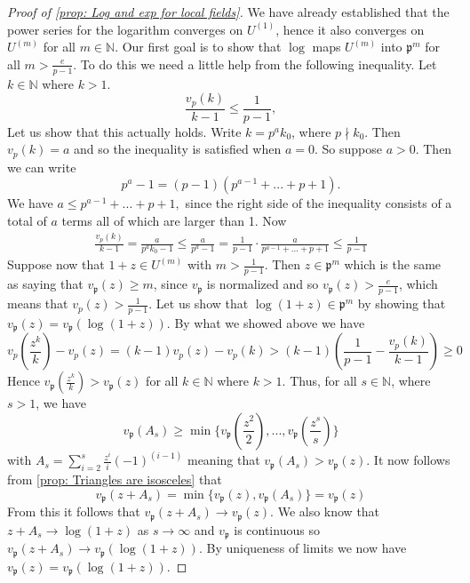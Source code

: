 \documentclass{article}
\newcommand{\mfrak}[1]{\mathfrak{#1}}
\newcommand{\mbb}[1]{\mathbb{#1}}
\newcommand{\vp}{{v_{\mfrak p}}}
\numberwithin{equation}{section}
\begin{document}
\begin{proof}[Proof of \cref{prop: Log and exp for local fields}]
    We have already established that the power series for the logarithm converges on $U^{(1)}$, hence it also converges on $U^{(m)}$ for all $m \in \mbb N$. Our first goal is to show that $\log$ maps $U^{(m)}$ into $\mfrak p^{m}$ for all $m > \frac{e}{p-1}$.  To do this we need a little help from the following inequality. Let $k \in \mbb N$ where $k > 1$.
    $$\frac{v_p(k)}{k-1} \leq \frac{1}{p-1},$$
    Let us show that this actually holds. Write $k = p^ak_0$, where $p \nmid k_0$. Then $v_p(k) = a$ and so the inequality is satisfied when $a = 0$. So suppose $a > 0$. Then we can write
    $$p^a - 1 = (p-1)(p^{a-1} + ... + p + 1).$$
    We have
    $a \leq p^{a-1} + ... + p + 1,$
    since the right side of the inequality consists of a total of $a$ terms all of which are larger than 1. Now
    \begin{align*}
        \frac{v_p(k)}{k-1} = \frac{a}{p^ak_0-1} \leq \frac{a}{p^a - 1} = \frac{1}{p-1}\cdot \frac{a}{p^{a-1} + ... + p + 1} \leq \frac{1}{p-1}
    \end{align*}
    Suppose now that $1+z \in U^{(m)}$ with $m > \frac{1}{p-1}$. Then $z \in \mfrak p^m$ which is the same as saying that $\vp (z) \geq m$, since $\vp$ is normalized and so $\vp(z) > \frac{e}{p-1}$, which means that $v_p(z) > \frac{1}{p-1}$. Let us show that $\log(1+z) \in \mfrak p^m$ by showing that $\vp(z) = \vp(\log(1+ z))$. By what we showed above we have
    $$v_p(\frac{z^k}{k}) - v_p(z) = (k-1)v_p(z) - v_p(k) > (k-1)(\frac{1}{p-1} - \frac{v_p(k)}{k-1}) \geq 0$$
    Hence $\vp(\frac{z^k}{k}) > \vp(z)$ for all $k \in \mbb N$ where $k > 1$. Thus, for all $s \in \mbb N$, where $s > 1$, we have $$\vp(A_s) \geq \min \{\vp(\frac{z^2}{2}), ..., \vp(\frac{z^s}{s}) \}$$
    with $A_s = \sum_{i = 2}^s \frac{z^i}{i} (-1)^{(i-1)}$ meaning that $\vp(A_s) > \vp(z)$. It now follows from \cref{prop: Triangles are isosceles} that
    $$\vp(z + A_s) = \min\{\vp(z), \vp(A_s)\} = \vp(z)$$
    From this it follows that $\vp(z + A_s) \to \vp(z)$. We also know that $z + A_s \to \log(1 + z)$ as $s \to \infty$ and $\vp$ is continuous so $\vp(z + A_s) \to \vp(\log(1 + z))$. By uniqueness of limits we now have $\vp(z) = \vp(\log(1+z))$.


\end{proof}
\end{document}
